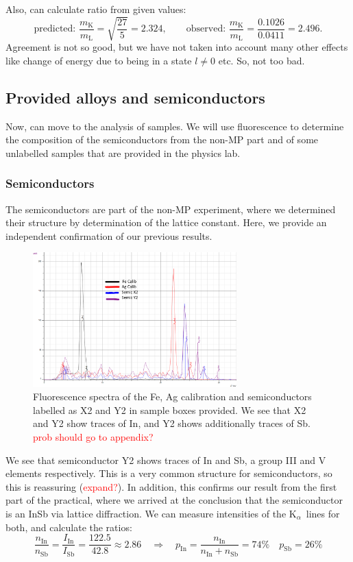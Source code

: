 \documentclass[11pt,a4paper,twoside,onecolumn]{article}
\newcommand{\reminder}[1]{\textcolor{red}{#1}}
\newcommand{\Kalpha}{$\mathrm{K}_\alpha$~}
\begin{document}
Also, can calculate ratio from given values:
\begin{equation}
    \text{predicted: }\frac{m_\mathrm{K}}{m_\mathrm{L}} = \sqrt{\frac{27}{5}} = 2.324,\qquad \text{observed: } \frac{m_\mathrm{K}}{m_\mathrm{L}} = \frac{0.1026}{0.0411} = 2.496.
\end{equation}
Agreement is not so good, but we have not taken into account many other effects like change of energy due to being in a state $l \neq 0$ etc. So, not too bad. %

\subsection{Provided alloys and semiconductors}
Now, can move to the analysis of samples. We will use fluorescence to determine the composition of the semiconductors from the non-MP part and of some unlabelled samples that are provided in the physics lab.

\subsubsection{Semiconductors}
The semiconductors are part of the non-MP experiment, where we determined their structure by determination of the lattice constant. Here, we provide an independent confirmation of our previous results. 
\begin{figure}[!htbp]
    \centering
    \includegraphics[width=0.7\textwidth]{img/spect-semiconductors.png}
    \caption{Fluorescence spectra of the Fe, Ag calibration and semiconductors labelled as X2 and Y2 in sample boxes provided. We see that X2 and Y2 show traces of In, and Y2 shows additionally traces of Sb. \reminder{prob should go to appendix?}}
    \label{fig:spect-semiconductors}
\end{figure}

We see that semiconductor Y2 shows traces of In and Sb, a group III and V elements respectively. This is a very common structure for semiconductors, so this is reassuring (\reminder{expand?}). In addition, this confirms our result from the first part of the practical, where we arrived at the conclusion that the semiconductor is an InSb via lattice diffraction. We can measure intensities of the \Kalpha lines for both, and calculate the ratios:
\begin{equation}
    \frac{n_\mathrm{In}}{n_\mathrm{Sb}} = \frac{I_\mathrm{In}}{I_\mathrm{Sb}} = \frac{122.5}{42.8} \approx 2.86 \quad \Rightarrow \quad p_\mathrm{In} = \frac{n_\mathrm{In}}{n_\mathrm{In}+n_\mathrm{Sb}} = 74 \% \quad p_\mathrm{Sb} = 26 \%
\end{equation}
\end{document}
